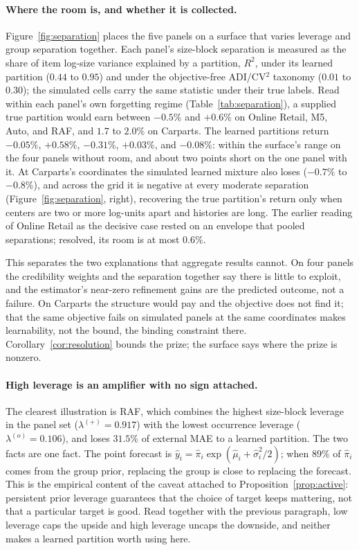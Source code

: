 \paragraph{Where the room is, and whether it is collected.}
Figure~\ref{fig:separation} places the five panels on a surface that
varies leverage and group separation together. Each panel's size-block
separation is measured as the share of item log-size variance explained
by a partition, $R^2$, under its learned partition ($0.44$ to $0.95$) and
under the objective-free ADI/CV$^2$ taxonomy ($0.01$ to $0.30$); the
simulated cells carry the same statistic under their true labels. Read
within each panel's own forgetting regime (Table~\ref{tab:separation}), a
supplied true partition would earn between $-0.5\%$ and $+0.6\%$ on
Online Retail, M5, Auto, and RAF, and $1.7$ to $2.0\%$ on Carparts. The
learned partitions return $-0.05\%$, $+0.58\%$, $-0.31\%$, $+0.03\%$, and
$-0.08\%$: within the surface's range on the four panels without room,
and about two points short on the one panel with it. At Carparts's
coordinates the simulated learned mixture also loses ($-0.7\%$ to $-0.8\%$), and across the grid it is negative at every moderate
separation (Figure~\ref{fig:separation}, right), recovering the true
partition's return only when centers are two or more log-units apart and
histories are long. The earlier reading of Online Retail as the decisive
case rested on an envelope that pooled separations; resolved, its room is
at most $0.6\%$.

This separates the two explanations that aggregate results cannot. On
four panels the credibility weights and the separation together say there
is little to exploit, and the estimator's near-zero refinement gains are
the predicted outcome, not a failure. On Carparts the structure would pay
and the objective does not find it; that the same objective fails on
simulated panels at the same coordinates makes learnability, not the
bound, the binding constraint there. Corollary~\ref{cor:resolution}
bounds the prize; the surface says where the prize is nonzero.

\paragraph{High leverage is an amplifier with no sign attached.}
The clearest illustration is RAF, which combines the highest size-block
leverage in the panel set ($\lambda^{(+)}=0.917$) with the lowest
occurrence leverage ($\lambda^{(o)}=0.106$), and loses $31.5\%$ of
external MAE to a learned partition. The two facts are one fact. The point
forecast is $\hat y_i=\hat\pi_i\exp(\hat\mu_i+\hat\sigma_i^2/2)$; when
$89\%$ of $\hat\pi_i$ comes from the group prior, replacing the group is
close to replacing the forecast. This is the empirical content of the
caveat attached to Proposition~\ref{prop:active}: persistent prior leverage
guarantees that the choice of target keeps mattering, not that a
particular target is good. Read together with the previous paragraph, low
leverage caps the upside and high leverage uncaps the downside, and
neither makes a learned partition worth using here.

